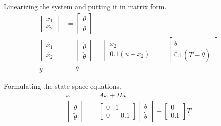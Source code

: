 \documentclass[11pt]{article}
\begin{document}
\begin{enumerate}[label=\textbf{\arabic*.}]
  Linearizing the system and putting it in matrix form.
  \begin{equation}
    \begin{split}
      \begin{bmatrix} 
        x_1 \\ x_2 
      \end{bmatrix}
      &= 
      \begin{bmatrix}
        \theta \\ \dot{\theta}
      \end{bmatrix}
      \\
      \begin{bmatrix} 
        \dot{x_1} \\ \dot{x_2} 
      \end{bmatrix}
      &= 
      \begin{bmatrix}
        \dot{\theta} \\ \ddot{\theta}
      \end{bmatrix}
      =
      \begin{bmatrix}
        x_2 \\ 0.1(u - x_2)
      \end{bmatrix}
      =
      \begin{bmatrix}
        \dot{\theta} \\ 0.1(T - \dot{\theta})
      \end{bmatrix}
      \\
      y &= \theta
    \end{split}
  \end{equation}

  Formulating the state space equations.
  \begin{equation}
    \begin{split}
      \dot{x} &= Ax + Bu \\
      \begin{bmatrix}
        \dot{\theta} \\ \ddot{\theta}
      \end{bmatrix}
      &= 
      \begin{bmatrix}
        0 & 1 \\ 0 & -0.1
      \end{bmatrix}
      \begin{bmatrix}
        \theta \\ \dot{\theta}
      \end{bmatrix}
      +
      \begin{bmatrix}
        0 \\ 0.1
      \end{bmatrix}
      T
    \end{split}
  \end{equation}


\end{enumerate}
\end{document}
